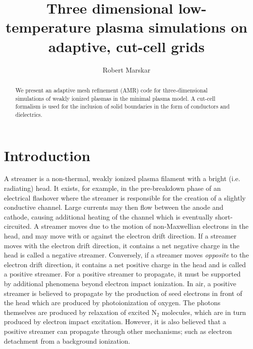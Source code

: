 \documentclass[3p]{elsarticle}
\title{Three dimensional low-temperature plasma simulations on adaptive, cut-cell grids}
\author[sintef]{Robert Marskar}
\begin{document}
\begin{abstract}
  We present an adaptive mesh refinement (AMR) code for three-dimensional simulations of weakly ionized plasmas in the minimal plasma model. A cut-cell formalism is used for the inclusion of solid boundaries in the form of conductors and dielectrics. 
\end{abstract}
\maketitle

\section{Introduction}
A streamer is a non-thermal, weakly ionized plasma filament with a bright (i.e. radiating) head. It exists, for example, in the pre-breakdown phase of an electrical flashover where the streamer is responsible for the creation of a slightly conductive channel. Large currents may then flow between the anode and cathode, causing additional heating of the channel which is eventually short-circuited. A streamer moves due to the motion of non-Maxwellian electrons in the head, and may move with or against the electron drift direction. If a streamer moves with the electron drift direction, it contains a net negative charge in the head is called a negative streamer. Conversely, if a streamer moves \emph{opposite} to the electron drift direction, it contains a net positive charge in the head and is called a positive streamer. For a positive streamer to propagate, it must be supported by additional phenomena beyond electron impact ionization. In air, a positive streamer is believed to propagate by the production of seed electrons in front of the head which are produced by photoionization of oxygen. The photons themselves are produced by relaxation of excited $\text{N}_2$ molecules, which are in turn produced by electron impact excitation. However, it is also believed that a positive streamer can propagate through other mechanisms; such as electron detachment from a background ionization. 
\end{document}
